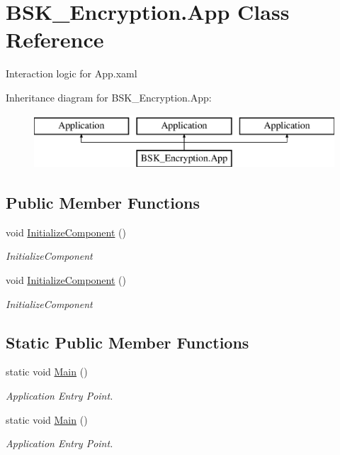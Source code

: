 \hypertarget{class_b_s_k___encryption_1_1_app}{}\section{B\+S\+K\+\_\+\+Encryption.\+App Class Reference}
\label{class_b_s_k___encryption_1_1_app}


Interaction logic for App.\+xaml  


Inheritance diagram for B\+S\+K\+\_\+\+Encryption.\+App\+:\begin{figure}[H]
\begin{center}
\leavevmode
\includegraphics[height=2.000000cm]{class_b_s_k___encryption_1_1_app}
\end{center}
\end{figure}
\subsection*{Public Member Functions}
\begin{DoxyCompactItemize}
\item 
void \mbox{\hyperlink{class_b_s_k___encryption_1_1_app_a0a8c21b54e3defaaeb83f7ff03549074}{Initialize\+Component}} ()
\begin{DoxyCompactList}\small\item\em Initialize\+Component \end{DoxyCompactList}\item 
void \mbox{\hyperlink{class_b_s_k___encryption_1_1_app_a0a8c21b54e3defaaeb83f7ff03549074}{Initialize\+Component}} ()
\begin{DoxyCompactList}\small\item\em Initialize\+Component \end{DoxyCompactList}\end{DoxyCompactItemize}
\subsection*{Static Public Member Functions}
\begin{DoxyCompactItemize}
\item 
static void \mbox{\hyperlink{class_b_s_k___encryption_1_1_app_a93bd4c8173c18bc4f08e342fce264162}{Main}} ()
\begin{DoxyCompactList}\small\item\em Application Entry Point. \end{DoxyCompactList}\item 
static void \mbox{\hyperlink{class_b_s_k___encryption_1_1_app_a93bd4c8173c18bc4f08e342fce264162}{Main}} ()
\begin{DoxyCompactList}\small\item\em Application Entry Point. \end{DoxyCompactList}\end{DoxyCompactItemize}


